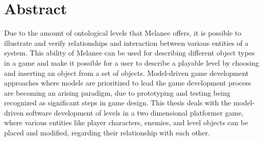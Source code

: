 \chapter{Abstract}
Due to the amount of ontological levels that Melanee offers, it is possible to illustrate and verify relationships and interaction between various entities of a system. This ability of Melanee can be used for describing different object types in a game and make it possible for a user to describe a playable level by choosing and inserting an object from a set of objects.  Model-driven game development approaches where models are prioritized to lead the game development process are becoming an arising paradigm, due to prototyping and testing being recognized as significant steps in game design. This thesis deals with the model-driven software development of levels in a two dimensional platformer game, where various entities like player characters, enemies, and level objects can be placed and modified, regarding their relationship with each other.

